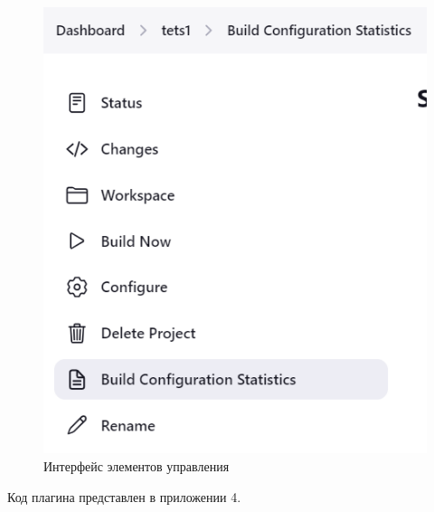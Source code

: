 \begin{figure}[ht!] 
	\center
	\includegraphics [scale=0.47] {my_folder/images//ui3}
	\caption{Интерфейс элементов управления} 
	\label{fig:ArchitectureJenkins}  
\end{figure}



Код плагина представлен в приложении 4.
 






%
%

%
%






